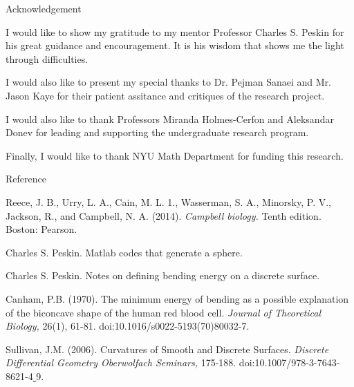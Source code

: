 \documentclass[10pt]{beamer}
\begin{document}
\begin{frame}{Acknowledgement}

 I would like to show my gratitude to my mentor Professor Charles S. Peskin for his great guidance and encouragement. It is his wisdom that shows me the light through difficulties.

 I would also like to present my special thanks to Dr. Pejman Sanaei and Mr. Jason Kaye for their patient assitance and critiques of the research project.

 I would also like to thank Professors Miranda Holmes-Cerfon and Aleksandar Donev for leading and supporting the undergraduate research program.

 Finally, I would like to thank NYU Math Department for funding this research.

\end{frame}

\begin{frame}{Reference}
\begin{thebibliography}{9}
	Reece, J. B., Urry, L. A., Cain, M. L. 1., Wasserman, S. A., Minorsky, P. V., Jackson, R., and Campbell, N. A. (2014).
	\textit{Campbell biology.} Tenth edition.
	Boston: Pearson.

	Charles S. Peskin.
	Matlab codes that generate a sphere.

	Charles S. Peskin.
	Notes on defining bending energy on a discrete surface.

	Canham, P.B. (1970).
	The minimum energy of bending as a possible explanation of the biconcave shape of the human red blood cell.
	\textit{Journal of Theoretical Biology,}
	26(1), 61-81. doi:10.1016/s0022-5193(70)80032-7.

	Sullivan, J.M. (2006).
	Curvatures of Smooth and Discrete Surfaces.
	\textit{Discrete Differential Geometry Oberwolfach Seminars,}
	175-188. doi:10.1007/978-3-7643-8621-4\underline{ }9.

\end{thebibliography}

\end{frame}
\end{document}
